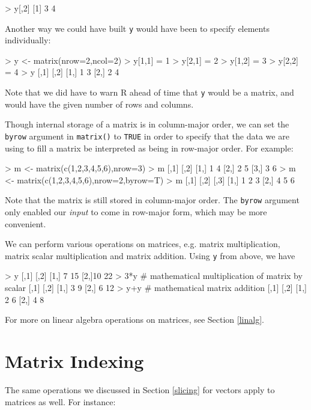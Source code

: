 \begin{Code}
> y[,2]
[1] 3 4
\end{Code}

Another  way we could have built {\tt y} would have been to specify elements
individually:

\begin{Code}
> y <- matrix(nrow=2,ncol=2)
> y[1,1] = 1
> y[2,1] = 2
> y[1,2] = 3
> y[2,2] = 4
> y
  [,1] [,2]
[1,] 1    3
[2,] 2    4
\end{Code}

Note that we did have to warn R ahead of time that {\tt y} would be a
matrix, and would have the given number of rows and columns.

Though internal storage of a matrix is in column-major order, we can set
the {\tt byrow} argument in {\tt matrix()} to {\tt TRUE} in order to specify
that the data we are using to fill a matrix be interpreted as being in
row-major order.  For example:

\begin{Code}
> m <- matrix(c(1,2,3,4,5,6),nrow=3)
> m
     [,1] [,2]
[1,]    1    4
[2,]    2    5
[3,]    3    6
> m <- matrix(c(1,2,3,4,5,6),nrow=2,byrow=T)
> m
     [,1] [,2] [,3]
[1,]    1    2    3
[2,]    4    5    6
\end{Code}


\noindent
Note that the matrix is still stored in column-major order.  The
{\tt byrow} argument only enabled our {\it input} to come in row-major
form, which may be more convenient.

We can perform various operations on matrices, e.g. matrix multiplication,
matrix scalar multiplication and matrix addition.  Using {\tt y} from
above, we have

\begin{Code}
> y %
  [,1] [,2]
[1,] 7   15
[2,]10   22
> 3*y  # mathematical multiplication of matrix by scalar
  [,1] [,2]
[1,] 3    9
[2,] 6   12
> y+y  # mathematical matrix addition
  [,1] [,2]
[1,] 2    6
[2,] 4    8
\end{Code}

For more on linear algebra operations on matrices, see Section \ref{linalg}.

\section{Matrix Indexing}

The  same  operations we discussed in Section \ref{slicing} for vectors
apply to matrices as well. For instance:

